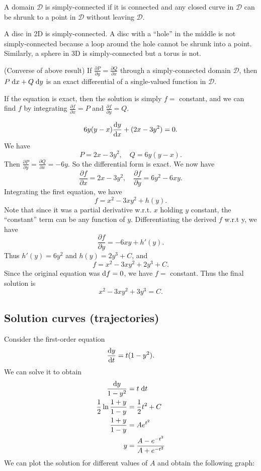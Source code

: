\documentclass[a4paper]{article}
\begin{document}
  \begin{defi}
    A domain $\mathcal{D}$ is simply-connected if it is connected and any closed curve in $\mathcal{D}$ can be shrunk to a point in $\mathcal{D}$ without leaving $\mathcal{D}$.
  \end{defi}

  \begin{eg}
    A disc in 2D is simply-connected. A disc with a ``hole'' in the middle is not simply-connected because a loop around the hole cannot be shrunk into a point. Similarly, a sphere in 3D is simply-connected but a torus is not. 
  \end{eg}

  \begin{thm}
    (Converse of above result) If $\frac{\partial P}{\partial y} = \frac{\partial Q}{\partial x}$ through a simply-connected domain $\mathcal{D}$, then $P\;\mathrm{d} x + Q\; \mathrm{d} y$ is an exact differential of a single-valued function in $\mathcal{D}$.
  \end{thm}
  If the equation is exact, then the solution is simply $f = $ constant, and we can find $f$ by integrating $\frac{\partial f}{\partial x} = P$ and $\frac{\partial f}{\partial y} = Q$.

  \begin{eg}
    \[
      6y(y - x)\frac{\mathrm{d} y}{\mathrm{d} x} + (2x - 3y^2) = 0.
    \]
    We have
    \[
      P = 2x - 3y^2, \quad Q = 6y(y - x).
    \]
    Then $\frac{\partial P}{\partial y} = \frac{\partial Q}{\partial x} = -6y$. So the differential form is exact. We now have
    \[
      \frac{\partial f}{\partial x} = 2x - 3y^2, \quad \frac{\partial f}{\partial y} = 6y^2 - 6xy.
    \]
    Integrating the first equation, we have
    \[
      f = x^2 - 3xy^2 + h(y).
    \]
    Note that since it was a partial derivative w.r.t. $x$ holding $y$ constant, the ``constant'' term can be any function of $y$. Differentiating the derived $f$ w.r.t y, we have
    \[
      \frac{\partial f}{\partial y} = -6xy + h'(y).
    \]
    Thus $h'(y) = 6y^2$ and $h(y) = 2y^3 + C$, and 
    \[
      f = x^2 - 3xy^2 + 2y^3 + C.
    \]
    Since the original equation was $\mathrm{d} f = 0$, we have $f = $ constant. Thus the final solution is
    \[
      x^2 - 3xy^2 + 3y^3 = C.
    \]
  \end{eg}

  \subsection{Solution curves (trajectories)}
  \begin{eg}
    Consider the first-order equation
    \[
      \frac{\mathrm{d} y}{\mathrm{d} t} = t(1 - y^2).
    \]
    We can solve it to obtain 
    \begin{align*}
      \frac{\mathrm{d} y}{1 - y^2} &= t\; \mathrm{d} t\\
      \frac{1}{2}\ln\frac{1 + y}{1 - y} &= \frac{1}{2}t^2 + C\\
      \frac{1 + y}{1 - y} &= Ae^{t^2}\\
      y &= \frac{A - e^{-t^2}}{A + e^{-t^2}}
    \end{align*}
    We can plot the solution for different values of $A$ and obtain the following graph:
  \end{eg}
\end{document}

